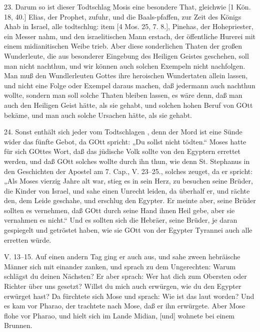 23. Darum so ist dieser Todtschlag Mosis eine besondere That, gleichwie [1 Kön. 18, 40.] Elias, der Prophet, zufuhr, und die Baals-pfaffen, zur Zeit des Königs Ahab in Israel, alle todtschlug: item [4 Mos. 25, 7. 8.], Pinehas, der Hohepriester, ein Messer nahm, und den israelitischen Mann erstach, der öffentliche Hurerei mit einem midianitischen Weibe trieb. Aber diese sonderlichen Thaten der großen Wunderleute, die aus besonderer Eingebung des Heiligen Geistes geschehen, soll man nicht nachthun, und wir können auch solchen Exempeln nicht nachfolgen. Man muß den Wundlerleuten Gottes ihre heroischen Wundertaten allein lassen, und nicht eine Folge oder Exempel daraus machen, daß jedermann auch nachthun wollte, sondern man soll solche Thaten bleiben lassen, es wäre denn, daß man auch den Heiligen Geist hätte, als sie gehabt, und solchen hohen Beruf von GOtt bekäme, und man auch solche Ursachen hätte, als sie gehabt.

24. Sonst enthält sich jeder vom Todtschlagen
, denn der Mord ist eine Sünde wider das fünfte Gebot, da GOtt spricht: „Du sollst nicht tödten.“ Moses hatte für sich GOttes Wort, daß das jüdische Volk sollte von den Egyptern errettet werden, und daß GOtt solches wollte durch ihn thun, wie denn St. Stephanus in den Geschichten der Apostel am 7. Cap., V. 23–25., solches zeuget, da er spricht: „Als Moses vierzig Jahre alt war, stieg es in sein Herz, zu besuchen seine Brüder, die Kinder von Israel, und sahe einen Unrecht leiden, da überhalf er, und rächte den, dem Leide geschahe, und erschlug den Egypter. Er meinte aber, seine Brüder sollten es vernehmen, daß GOtt durch seine Hand ihnen Heil gebe, aber sie vernahmen es nicht.“ Und es sollten sich die Hebräer, seine Brüder, je daran gespiegelt und getröstet haben, wie sie GOtt von der Egypter Tyrannei auch alle erretten würde.

\begin{schriftzitat}
V. 13–15. Auf einen andern Tag ging er auch aus, und sahe zween hebräische Männer sich mit einander zanken, und sprach zu dem Ungerechten: Warum schlägst du deinen Nächsten? Er aber sprach: Wer hat dich zum Obersten oder Richter über uns gesetzt? Willst du mich auch erwürgen, wie du den Egypter erwürget hast? Da fürchtete sich Mose und sprach: Wie ist das laut worden? Und es kam vor Pharao, der trachtete nach Mose, daß er ihn erwürgete. Aber Mose flohe vor Pharao, und hielt sich im Lande Midian, [und] wohnete bei einem Brunnen.
\end{schriftzitat}

